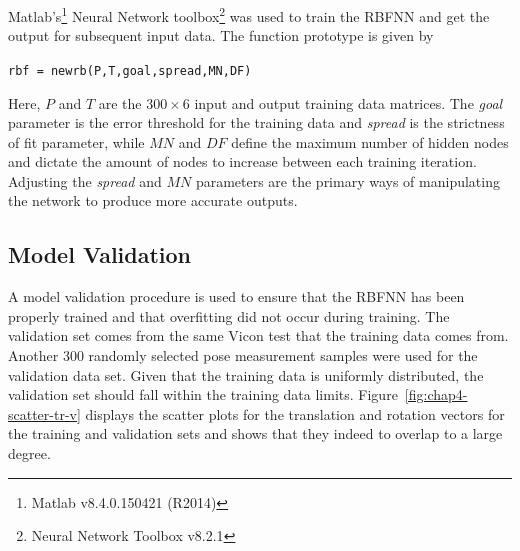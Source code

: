 Matlab's\footnote{Matlab v8.4.0.150421 (R2014)} Neural Network toolbox\footnote{Neural Network Toolbox v8.2.1} was used to train the RBFNN and get the output for subsequent input data. The function prototype is given by 

\begin{center}
  \verb|rbf = newrb(P,T,goal,spread,MN,DF)|
\end{center}

Here, $P$ and $T$ are the $300\times6$ input and output training data matrices. The \emph{goal} parameter is the error threshold for the training data and \emph{spread} is the strictness of fit parameter, while $\mathit{MN}$ and $\mathit{DF}$ define the maximum number of hidden nodes and dictate the amount of nodes to increase between each training iteration. Adjusting the \emph{spread} and $\mathit{MN}$ parameters are the primary ways of manipulating the network to produce more accurate outputs. 

\subsection{Model Validation}

A model validation procedure is used to ensure that the RBFNN has been properly trained and that overfitting did not occur during training. The validation set comes from the same Vicon test that the training data comes from. Another 300 randomly selected  pose measurement samples were used for the validation data set. Given that the training data is uniformly distributed, the validation set should fall within the training data limits. Figure~\ref{fig:chap4-scatter-tr-v} displays the scatter plots for the translation and rotation vectors for the training and validation sets and shows that they indeed to overlap to a large degree. 

